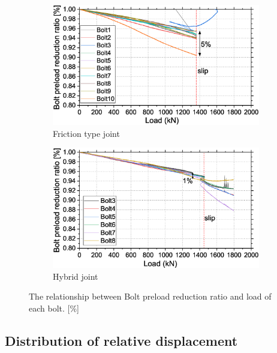 \begin{figure}[htbp]
    \centering
    \begin{subfigure}[t]{0.7\textwidth}
    \centering
    \includegraphics[width=\linewidth]{imgs/ch6/loadaf-fric.eps}
    \caption{Friction type joint }
    \label{fig-laff}
    \end{subfigure}
    \begin{subfigure}[t]{0.7\textwidth}
    \centering
    \includegraphics[width=\linewidth]{imgs/ch6/loadaf-hyb.eps}
    \caption{Hybrid joint }
    \label{fig-lafhy}
    \end{subfigure}
    \caption{The relationship between Bolt preload reduction ratio and load of each bolt. [\%]}
    \label{fig-laf}
\end{figure}

\subsection{Distribution of relative displacement}

